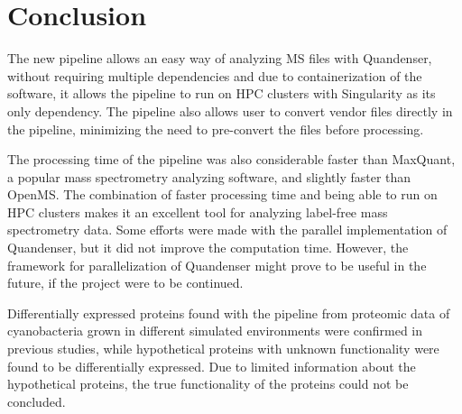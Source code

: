 \section{Conclusion}

The new pipeline allows an easy way of analyzing MS files with Quandenser, without requiring multiple dependencies and due to containerization of the software, it allows the pipeline to run on HPC clusters with Singularity as its only dependency. The pipeline also allows user to convert vendor files directly in the pipeline, minimizing the need to pre-convert the files before processing.

The processing time of the pipeline was also considerable faster than MaxQuant, a popular mass spectrometry analyzing software, and slightly faster than OpenMS. The combination of faster processing time and being able to run on HPC clusters makes it an excellent tool for analyzing label-free mass spectrometry data. Some efforts were made with the parallel implementation of Quandenser, but it did not improve the computation time. However, the framework for parallelization of Quandenser might prove to be useful in the future, if the project were to be continued.

Differentially expressed proteins found with the pipeline from proteomic data of cyanobacteria grown in different simulated environments were confirmed in previous studies, while hypothetical proteins with unknown functionality were found to be differentially expressed. Due to limited information about the hypothetical proteins, the true functionality of the proteins could not be concluded.
